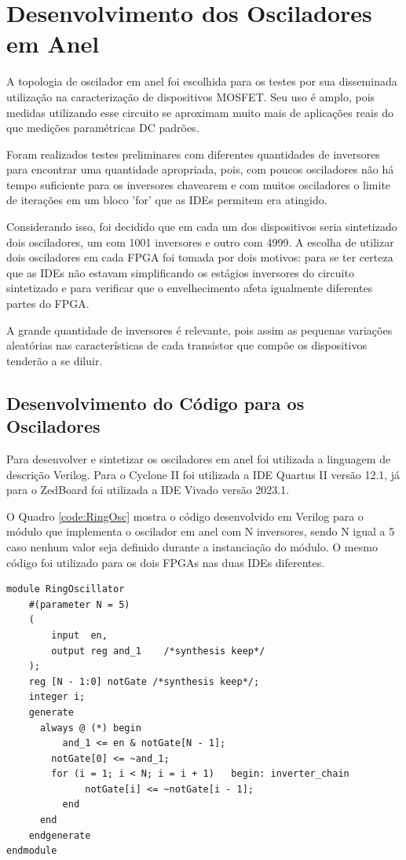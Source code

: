 \section{Desenvolvimento dos Osciladores em Anel}
\label{sec:MetOscilador}

A topologia de oscilador em anel foi escolhida para os testes por sua disseminada utilização na caracterização de dispositivos MOSFET. Seu uso é amplo, pois medidas utilizando esse circuito se aproximam muito mais de aplicações reais do que medições paramétricas DC padrões.

Foram realizados testes preliminares com diferentes quantidades de inversores para encontrar uma quantidade apropriada, pois, com poucos osciladores não há tempo suficiente para os inversores chavearem e com muitos osciladores o limite de iterações em um bloco 'for' que as IDEs permitem era atingido.

Considerando isso, foi decidido que em cada um dos dispositivos seria sintetizado dois osciladores, um com 1001 inversores e outro com 4999. A escolha de utilizar dois osciladores em cada FPGA foi tomada por dois motivos: para se ter certeza que as IDEs não estavam simplificando os estágios inversores do circuito sintetizado e para verificar que o envelhecimento afeta igualmente diferentes partes do FPGA.

A grande quantidade de inversores é relevante, pois assim as pequenas variações aleatórias nas características de cada transistor que compõe os dispositivos tenderão a se diluir.

\subsection{Desenvolvimento do Código para os Osciladores}

Para desenvolver e sintetizar os osciladores em anel foi utilizada a linguagem de descrição Verilog. Para o Cyclone II foi utilizada a IDE Quartus II versão 12.1, já para o ZedBoard foi utilizada a IDE Vivado versão 2023.1.

O Quadro \ref{code:RingOsc} mostra o código desenvolvido em Verilog para o módulo que implementa o oscilador em anel com N inversores, sendo N igual a 5 caso nenhum valor seja definido durante a instanciação do módulo. O mesmo código foi utilizado para os dois FPGAs nas duas IDEs diferentes.

\begin{lstlisting}[label={code:RingOsc}, style=VerilogStyle, caption={Módulo do Oscilador em Anel. Fonte: O Autor}]
module RingOscillator 
	#(parameter N = 5)
	(
		input  en,
		output reg and_1    /*synthesis keep*/
	);
	reg [N - 1:0] notGate /*synthesis keep*/;
	integer i;
	generate
	  always @ (*) begin
		  and_1 <= en & notGate[N - 1];
	  	notGate[0] <= ~and_1;
	  	for (i = 1; i < N; i = i + 1)   begin: inverter_chain
			  notGate[i] <= ~notGate[i - 1];
		  end
	  end
	endgenerate
endmodule
\end{lstlisting}

